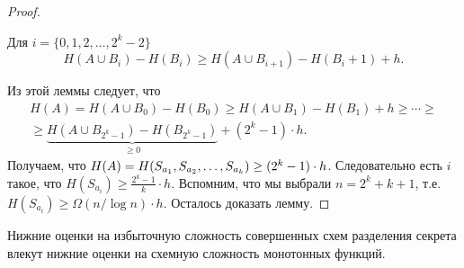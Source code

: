\documentclass[12pt]{article}
\begin{document}
\begin{proof}
    \begin{lemma}\label{lm:secretlb} Для $i=\{0,1,2,\dots,2^k-2\}$
        \[
            H(A\cup B_i) - H(B_i) \ge H(A\cup B_{i+1}) - H(B_i+1) + h.
        \]
    \end{lemma}
    Из этой леммы следует, что 
    \begin{multline*}
        H(A) = H(A\cup B_0) - H(B_0) \ge H(A\cup B_{1}) - H(B_1) + h \ge \dotsb \ge\\
        \ge \underbrace{H(A\cup B_{2^k-1}) - H(B_{2^k-1})}_{\ge 0} + (2^k - 1)\cdot h.
    \end{multline*}
    Получаем, что $H(A) = H({S}_{{a}_1},{S}_{{a}_2},\dotsc,{S}_{{a}_{k}})\ge (2^k - 1) \cdot h$. Следовательно есть $i$ такое,
    что $H(S_{a_i})\ge \frac{2^k - 1}{k}\cdot h$.
    Вспомним, что мы выбрали $n = 2^k + k + 1$, т.е. $H(S_{a_i})\ge \Omega(n/\log n) \cdot h$.
    Осталось доказать лемму.
%    
%
%
%
\end{proof}
    \begin{remark}
        Нижние оценки на избыточную сложность совершенных схем разделения
        секрета влекут нижние оценки на схемную сложность монотонных функций.
    \end{remark}
\end{document}
